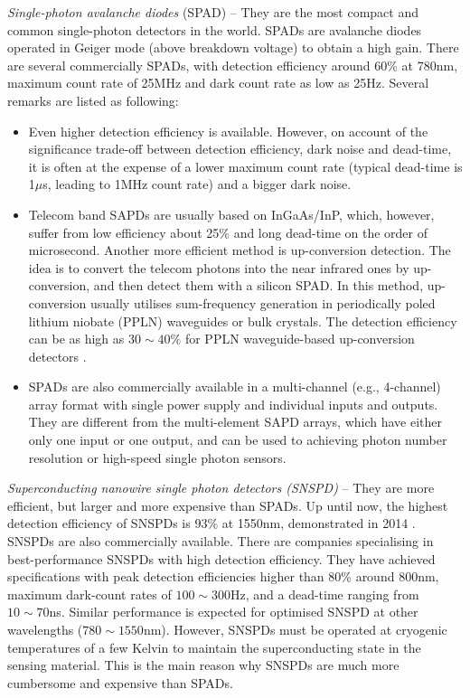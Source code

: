 \documentclass[aps,rmp,twocolumn,amsmath,amssymb,nofootinbib,superscriptaddress,longbibliography,floatfix,table-of-contents,eqsecnum]{revtex4-1}
\begin{document}
\textit{Single-photon avalanche diodes} (SPAD) -- They are the most compact and common single-photon detectors in the world. SPADs are avalanche diodes operated in Geiger mode (above breakdown voltage) to obtain a high gain. There are several commercially SPADs, with detection efficiency around 60\% at 780nm, maximum count rate of 25MHz and dark count rate as low as 25Hz. Several remarks are listed as following:

\begin{itemize}
    \item Even higher detection efficiency is available. However, on account of the significance trade-off between detection efficiency, dark noise and dead-time, it is often at the expense of a lower maximum count rate (typical dead-time is 1$\mu$s, leading to 1MHz count rate) and a bigger dark noise.

    \item Telecom band SAPDs are usually based on InGaAs/InP, which, however, suffer from low efficiency about 25\% and long dead-time on the order of microsecond. Another more efficient method is up-conversion detection. The idea is to convert the telecom photons into the near infrared ones by up-conversion, and then detect them with a silicon SPAD. In this method, up-conversion usually utilises sum-frequency generation in periodically poled lithium niobate (PPLN) waveguides or bulk crystals. The detection efficiency can be as high as \mbox{$30\sim 40\%$} for PPLN waveguide-based up-conversion detectors \cite{shentu2013ultralow}.
    \item SPADs are also commercially available in a multi-channel (e.g., 4-channel) array format with single power supply and individual inputs and outputs. They are different from the multi-element SAPD arrays, which have either only one input or one output, and can be used to achieving photon number resolution or high-speed single photon sensors.
\end{itemize}

\textit{Superconducting nanowire single photon detectors (SNSPD)} -- They are more efficient, but larger and more expensive than SPADs. Up until now, the highest detection efficiency of SNSPDs is 93\% at 1550nm, demonstrated in 2014 \cite{marsili2013}. SNSPDs are also commercially available. There are companies specialising in best-performance SNSPDs with high detection efficiency. They have achieved specifications with peak detection efficiencies higher than 80\% around 800nm, maximum dark-count rates of \mbox{$100\sim 300$Hz}, and a dead-time ranging from \mbox{$10\sim 70$ns}. Similar performance is expected for optimised SNSPD at other wavelengths (\mbox{$780\sim 1550$nm}). However, SNSPDs must be operated at cryogenic temperatures of a few Kelvin to maintain the superconducting state in the sensing material. This is the main reason why SNSPDs are much more cumbersome and expensive than SPADs.
\end{document}
